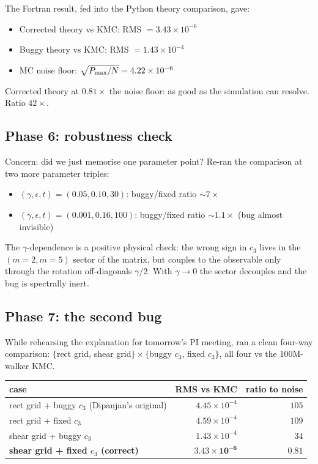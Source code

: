 \documentclass[11pt,a4paper]{article}
\begin{document}
The Fortran result, fed into the Python theory comparison, gave:
\begin{itemize}[leftmargin=*,nosep]
\item Corrected theory vs KMC: RMS $= 3.43 \times 10^{-6}$
\item Buggy theory vs KMC: RMS $= 1.43 \times 10^{-4}$
\item MC noise floor: $\sqrt{P_{\rm max}/N} = 4.22 \times 10^{-6}$
\end{itemize}
Corrected theory at $0.81\times$ the noise floor: as good as the
simulation can resolve. Ratio $42\times$.

\subsection{Phase 6: robustness check}\label{ssec:phase6}

Concern: did we just memorise one parameter point? Re-ran the
comparison at two more parameter triples:
\begin{itemize}[leftmargin=*,nosep]
\item $(\gamma, \epsilon, t) = (0.05, 0.10, 30)$: buggy/fixed ratio $\sim 7\times$
\item $(\gamma, \epsilon, t) = (0.001, 0.16, 100)$: buggy/fixed ratio $\sim 1.1\times$ (bug almost invisible)
\end{itemize}

The $\gamma$-dependence is a positive physical check: the wrong sign in
$c_3$ lives in the $(m=2, m=5)$ sector of the matrix, but couples to
the observable only through the rotation off-diagonals $\gamma/2$. With
$\gamma \to 0$ the sector decouples and the bug is spectrally inert.

\subsection{Phase 7: the second bug}\label{ssec:phase7}

While rehearsing the explanation for tomorrow's PI meeting, ran a clean
four-way comparison: $\{$rect grid, shear grid$\} \times \{$buggy $c_3$, fixed $c_3\}$,
all four vs the 100M-walker KMC.

\begin{center}\small
\renewcommand{\arraystretch}{1.25}
\begin{tabular}{lrr}
\toprule
case & RMS vs KMC & ratio to noise \\
\midrule
\rowcolor{badfill!60} rect grid + buggy $c_3$ (Dipanjan's original) & $4.45 \times 10^{-4}$ & $105$ \\
\rowcolor{badfill!30} rect grid + fixed $c_3$ & $4.59 \times 10^{-4}$ & $109$ \\
\rowcolor{badfill!30} shear grid + buggy $c_3$ & $1.43 \times 10^{-4}$ & $34$ \\
\rowcolor{goodfill!70} \textbf{shear grid + fixed $c_3$ (correct)} & $\mathbf{3.43 \times 10^{-6}}$ & $\mathbf{0.81}$ \\
\bottomrule
\end{tabular}
\end{center}
\end{document}
